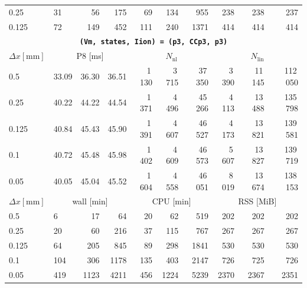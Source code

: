 \documentclass[11pt,a4paper]{article}
\newcommand{\code}[1]{\texttt{\small #1}}
\begin{document}
\begin{center}
\begin{longtable}{l|lrr|rrr|rrr}
0.25 & 31 & 56 & 175 & 69 & 134 & 955 & 238 & 238 & 237\\
0.125 & 72 & 149 & 452 & 111 & 240 & 1371 & 414 & 414 & 414\\
\hline
\hline
\multicolumn{10}{c}{\textbf{\code{(Vm, states, Iion) = (p3, CCp3, p3)}}}\\\hline
$ \Delta x [\text{mm}] $ & \multicolumn{3}{c|}{P8 [ms]} & \multicolumn{3}{c|}{$N_{\mathrm{nl}}$} & \multicolumn{3}{c|}{$N_{\mathrm{lin}}$}\\
0.5 & 33.09 & 36.30 & 36.51 & 1\,130 & 3\,715 & 37\,350 & 3\,390 & 11\,145 & 112\,050\\
0.25 & 40.22 & 44.22 & 44.54 & 1\,371 & 4\,496 & 45\,266 & 4\,113 & 13\,488 & 135\,798\\
0.125 & 40.84 & 45.43 & 45.90 & 1\,391 & 4\,607 & 46\,527 & 4\,173 & 13\,821 & 139\,581\\
0.1 & 40.72 & 45.48 & 45.98 & 1\,402 & 4\,609 & 46\,573 & 5\,607 & 13\,827 & 139\,719\\
0.05 & 40.05 & 45.04 & 45.52 & 1\,604 & 4\,558 & 46\,051 & 8\,019 & 13\,674 & 138\,153\\
\hline
$ \Delta x [\text{mm}] $ & \multicolumn{3}{c|}{wall [min]} & \multicolumn{3}{c|}{CPU [min]} & \multicolumn{3}{c|}{RSS [MiB]}\\
0.5 & 6 & 17 & 64 & 20 & 62 & 519 & 202 & 202 & 202\\
0.25 & 20 & 60 & 216 & 37 & 115 & 767 & 267 & 267 & 267\\
0.125 & 64 & 205 & 845 & 89 & 298 & 1841 & 530 & 530 & 530\\
0.1 & 104 & 306 & 1178 & 135 & 403 & 2147 & 726 & 725 & 726\\
0.05 & 419 & 1123 & 4211 & 456 & 1224 & 5239 & 2370 & 2367 & 2351\\
\hline
\bottomrule\end{longtable}\end{center}
\end{document}
